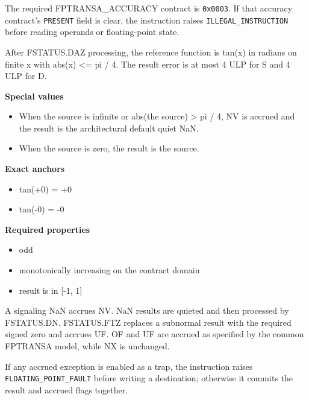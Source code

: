 The required FPTRANSA\_ACCURACY contract is \texttt{0x0003}. If that accuracy contract's \texttt{PRESENT} field is clear, the instruction raises \texttt{ILLEGAL\_INSTRUCTION} before reading operands or floating-point state.

After FSTATUS.DAZ processing, the reference function is tan(x) in radians on finite x with abs(x) \textless{}= pi / 4. The result error is at most 4 ULP for S and 4 ULP for D.

\textbf{Special values}\par
\begin{itemize}
\item When the source is infinite or abs(the source) \textgreater{} pi / 4, NV is accrued and the result is the architectural default quiet NaN.
\item When the source is zero, the result is the source.
\end{itemize}

\textbf{Exact anchors}\par
\begin{itemize}
\item tan(+0) = +0
\item tan(-0) = -0
\end{itemize}

\textbf{Required properties}\par
\begin{itemize}
\item odd
\item monotonically increasing on the contract domain
\item result is in [-1, 1]
\end{itemize}

A signaling NaN accrues NV. NaN results are quieted and then processed by FSTATUS.DN. FSTATUS.FTZ replaces a subnormal result with the required signed zero and accrues UF. OF and UF are accrued as specified by the common FPTRANSA model, while NX is unchanged.

If any accrued exception is enabled as a trap, the instruction raises \texttt{FLOATING\_POINT\_FAULT} before writing a destination; otherwise it commits the result and accrued flags together.
